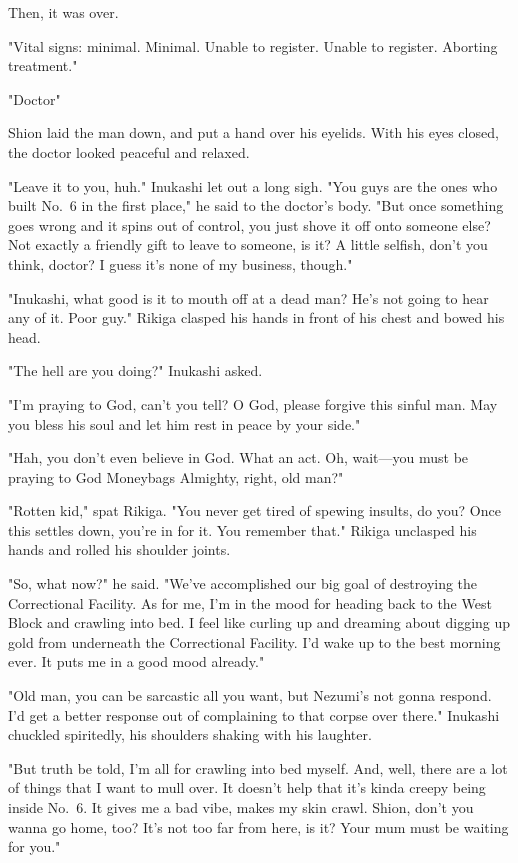 Then, it was over.

{\sffamily "Vital signs: minimal. Minimal. Unable to register. Unable to register.
Aborting treatment."}

"Doctor\el "

Shion laid the man down, and put a hand over his eyelids. With his eyes
closed, the doctor looked peaceful and relaxed.

"Leave it to you, huh." Inukashi let out a long sigh. "You guys are the
ones who built No.~6 in the first place," he said to the doctor's body.
"But once something goes wrong and it spins out of control, you just
shove it off onto someone else? Not exactly a friendly gift to leave to
someone, is it? A little selfish, don't you think, doctor? I guess it's
none of my business, though."

"Inukashi, what good is it to mouth off at a dead man? He's not going to
hear any of it. Poor guy." Rikiga clasped his hands in front of his
chest and bowed his head.

"The hell are you doing?" Inukashi asked.

"I'm praying to God, can't you tell? O God, please forgive this sinful
man. May you bless his soul and let him rest in peace by your side."

"Hah, you don't even believe in God. What an act. Oh, wait---you must be
praying to God Moneybags Almighty, right, old man?"

"Rotten kid," spat Rikiga. "You never get tired of spewing insults, do
you? Once this settles down, you're in for it. You remember that."
Rikiga unclasped his hands and rolled his shoulder joints.

"So, what now?" he said. "We've accomplished our big goal of destroying
the Correctional Facility. As for me, I'm in the mood for heading back
to the West Block and crawling into bed. I feel like curling up and
dreaming about digging up gold from underneath the Correctional
Facility. I'd wake up to the best morning ever. It puts me in a good
mood already."

"Old man, you can be sarcastic all you want, but Nezumi's not gonna
respond. I'd get a better response out of complaining to that corpse
over there." Inukashi chuckled spiritedly, his shoulders shaking with
his laughter.

"But truth be told, I'm all for crawling into bed myself. And, well,
there are a lot of things that I want to mull over. It doesn't help that
it's kinda creepy being inside No.~6. It gives me a bad vibe, makes my
skin crawl. Shion, don't you wanna go home, too? It's not too far from
here, is it? Your mum must be waiting for you."


